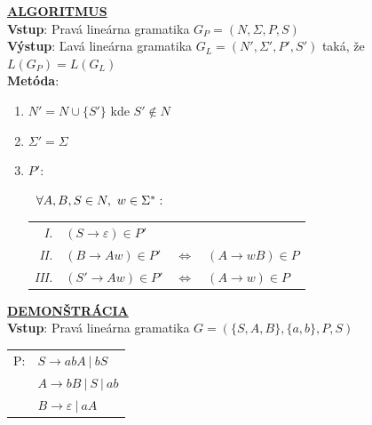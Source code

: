 \documentclass[11pt,a4paper]{article}
\begin{document}
\underline{\textbf{\large{ALGORITMUS}}}\\[0.3em]
\textbf{Vstup}: Pravá lineárna gramatika $G_P = (N,\Sigma,P,S)$\\
\textbf{Výstup}: Ľavá lineárna gramatika $G_L = (N',\Sigma',P',S')$ taká, že $L(G_P)=L(G_L)$\\
\textbf{Metóda}:\\[-2em]
\begin{center}
\begin{minipage}{0.9\textwidth}
\begin{enumerate}[1.)]
    \item $N' = N \cup \{S'\}$ kde $ S' \notin N$\\[-2em]
    \item $\Sigma' = \Sigma$\\[-2em]
    \item $P'$:\\[-3.275em]
    \begin{center}
    \begin{minipage}{0.85\textwidth}
            $\hspace{0.6em}\forall A,B,S \in N,\  w \in \Sigma^*:$\\
        \begin{tabular}{r|lcl}
            \textit{I.}   & $(S \rightarrow \varepsilon) \in P'$\\
            \textit{II.}  & $(B  \rightarrow Aw) \in P'$ & $\Longleftrightarrow$ & $(A \rightarrow wB) \in P$\\
            \textit{III.} & $(S' \rightarrow Aw) \in P'$ & $\Longleftrightarrow$ & $(A \rightarrow w ) \in P$\\
        \end{tabular}
    \end{minipage}
    \end{center}
\end{enumerate}
\end{minipage}
\end{center}

\hfill

\underline{\textbf{\large{DEMONŠTRÁCIA}}}\\[0.3em]
\textbf{Vstup}: Pravá lineárna gramatika $G = (\{S,A,B\}, \{a, b\}, P, S)$\\[-1.25em]
\begin{center}
\begin{tabular}{ll}
    P:&$S \rightarrow abA\ |\ bS$\\
    &$A \rightarrow bB\ |\ S\ |\ ab$\\
    &$B \rightarrow \varepsilon\ |\ aA$\\
\end{tabular}
\end{center}
\end{document}
